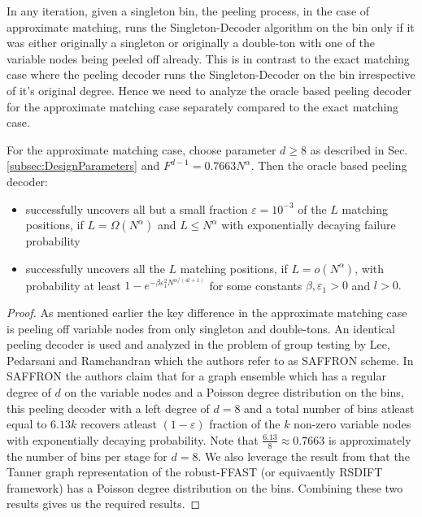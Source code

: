 In any iteration, given a singleton bin, the peeling process, in the case of approximate matching, runs the Singleton-Decoder algorithm on the bin only if it was either originally a singleton or originally a double-ton with one of the variable nodes being peeled off already. This is in contrast to the exact matching case where the peeling decoder runs the Singleton-Decoder on the bin irrespective of it's original degree. Hence we need to analyze the oracle based peeling decoder for the approximate matching case separately compared to the exact matching case. 
\begin{lemma}
For the approximate matching case, choose parameter $d\geq 8$ as described in Sec. \ref{subsec:DesignParameters} and $F^{d-1}=0.7663 N^{\alpha}$. Then the oracle based peeling decoder: %
\begin{itemize}
\item successfully uncovers all but a small fraction $\varepsilon=10^{-3}$ of the $L$ matching positions, if $L=\Omega(N^{\alpha})$ and $L\leq N^{\alpha}$ with exponentially decaying failure probability
\item successfully uncovers all the $L$ matching positions, if $L=o(N^{\alpha})$, with probability at least $1-e^{-\beta \varepsilon_1^2N^{\alpha/(4l+1)}}$ for some constants $\beta,\varepsilon_1>0$ and $l>0.$
\end{itemize}
\end{lemma}
\begin{proof}
As mentioned earlier the key difference in the approximate matching case is peeling off variable nodes from only singleton and double-tons. An identical peeling decoder is used and analyzed in the problem of group testing \cite{lee2015saffron} by Lee, Pedarsani and Ramchandran which the authors refer to as SAFFRON scheme. In SAFFRON the authors claim that for a graph ensemble which has a regular degree of $d$ on the variable nodes and a  Poisson degree distribution on the bins, this peeling decoder with a left degree of $d=8$ and a total number of bins atleast equal to $6.13 k$ recovers atleast $(1-\varepsilon)$ fraction of the $k$ non-zero variable nodes with exponentially decaying probability. Note that $\frac{6.13}{8}\approx 0.7663$ is approximately the number of bins per stage for $d=8$. We also leverage the result from \cite{pawar2014robust} that the Tanner graph representation of the robust-FFAST (or equivaently RSDIFT framework) has a Poisson degree distribution on the bins. Combining these two results gives us the required results.
\end{proof}